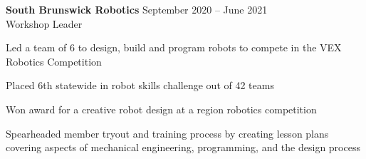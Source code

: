 \documentclass{article}
\newcommand{\employer}[4]{{
\vspace*{2pt}%
\textbf{#1} #2 \hfill #3\\ #4 \vspace*{2pt}}
}
\renewcommand{\labelitemii}{
$\vcenter{\hbox{\tiny$\bullet$}}$\hspace*{-3pt}
}
\newenvironment{bullet-list-minor}{
\begin{list}{\labelitemii}{\setlength\leftmargin{15pt} 
\topsep 0pt \itemsep -2pt}}{\vspace*{4pt}\end{list}
}
\begin{document}
    \employer{South Brunswick Robotics}
    {}{September 2020 -- June 2021}{Workshop Leader}
	\begin{bullet-list-minor}
	\item Led a team of 6 to design, build and program robots to compete in the VEX Robotics Competition
    \item Placed 6th statewide in robot skills challenge out of 42 teams
    \item Won award for a creative robot design at a region robotics competition
    \item Spearheaded member tryout and training process by creating lesson plans covering aspects of mechanical engineering, programming, and the design process
    \end{bullet-list-minor}
\end{document}
